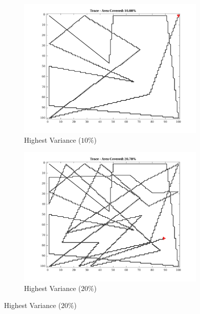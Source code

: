 \begin{figure}[htb!]
    \centering
        \begin{subfigure}[t]{0.32\textwidth}
        \centering
        \includegraphics[width=\linewidth]{figures/hbresults/path_nhv_10p_100x100_sf_50_seed_2.png}
        \ssp
        \captionsetup{skip=0.20\baselineskip,size=footnotesize}
        \caption{Highest Variance ($10\%$)}
    \end{subfigure}%
    \begin{subfigure}[t]{0.32\textwidth}
        \centering
        \includegraphics[width=\linewidth]{figures/hbresults/path_nhv_20p_100x100_sf_50_seed_2.png}
        \ssp
        \captionsetup{skip=0.20\baselineskip,size=footnotesize}
        \caption{Highest Variance ($20\%$)}

\end{subfigure}
\end{figure}
